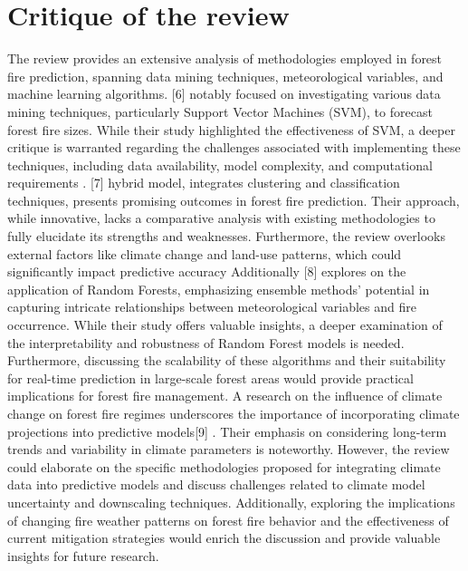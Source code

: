\section{Critique of the review
}
\label{sec:into_back} 
The review provides an extensive analysis of methodologies employed in forest fire prediction, spanning data mining techniques, meteorological variables, and machine learning algorithms. [6] notably focused on investigating various data mining techniques, particularly Support Vector Machines (SVM), to forecast forest fire sizes. While their study highlighted the effectiveness of SVM, a deeper critique is warranted regarding the challenges associated with implementing these techniques, including data availability, model complexity, and computational requirements . [7] hybrid model, integrates clustering and classification techniques, presents promising outcomes in forest fire prediction. Their approach, while innovative, lacks a comparative analysis with existing methodologies to fully elucidate its strengths and weaknesses. Furthermore, the review overlooks external factors like climate change and land-use patterns, which could significantly impact predictive accuracy
Additionally [8] explores on the application of Random Forests, emphasizing ensemble methods' potential in capturing intricate relationships between meteorological variables and fire occurrence. While their study offers valuable insights, a deeper examination of the interpretability and robustness of Random Forest models is needed. Furthermore, discussing the scalability of these algorithms and their suitability for real-time prediction in large-scale forest areas would provide practical implications for forest fire management. A research on the influence of climate change on forest fire regimes underscores the importance of incorporating climate projections into predictive models[9] . Their emphasis on considering long-term trends and variability in climate parameters is noteworthy. However, the review could elaborate on the specific methodologies proposed for integrating climate data into predictive models and discuss challenges related to climate model uncertainty and downscaling techniques. Additionally, exploring the implications of changing fire weather patterns on forest fire behavior and the effectiveness of current mitigation strategies would enrich the discussion and provide valuable insights for future research.

